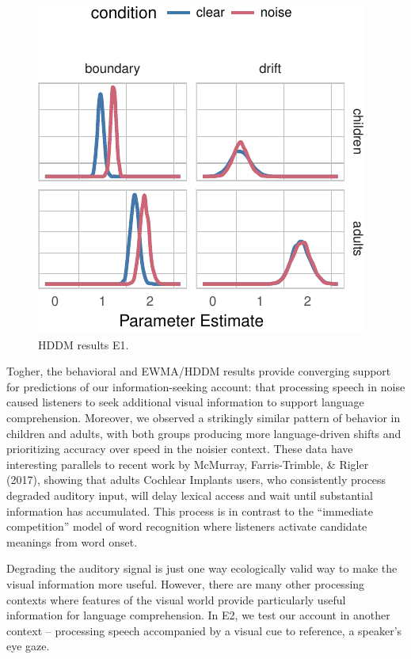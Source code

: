 \documentclass[10pt, letterpaper]{article}
\newenvironment{CodeChunk}{}{}
\begin{document}
\begin{CodeChunk}
\begin{figure}[t]

{\centering \includegraphics[width=0.7\linewidth]{figs/hddm_plot_noise-1} 

}

\caption[HDDM results E1]{HDDM results E1.}\label{fig:hddm_plot_noise}
\end{figure}
\end{CodeChunk}

Togher, the behavioral and EWMA/HDDM results provide converging support
for predictions of our information-seeking account: that processing
speech in noise caused listeners to seek additional visual information
to support language comprehension. Moreover, we observed a strikingly
similar pattern of behavior in children and adults, with both groups
producing more language-driven shifts and prioritizing accuracy over
speed in the noisier context. These data have interesting parallels to
recent work by McMurray, Farris-Trimble, \& Rigler (2017), showing that
adults Cochlear Implants users, who consistently process degraded
auditory input, will delay lexical access and wait until substantial
information has accumulated. This process is in contrast to the
``immediate competition'' model of word recognition where listeners
activate candidate meanings from word onset.

Degrading the auditory signal is just one way ecologically valid way to
make the visual information more useful. However, there are many other
processing contexts where features of the visual world provide
particularly useful information for language comprehension. In E2, we
test our account in another context -- processing speech accompanied by
a visual cue to reference, a speaker's eye gaze.
\end{document}
